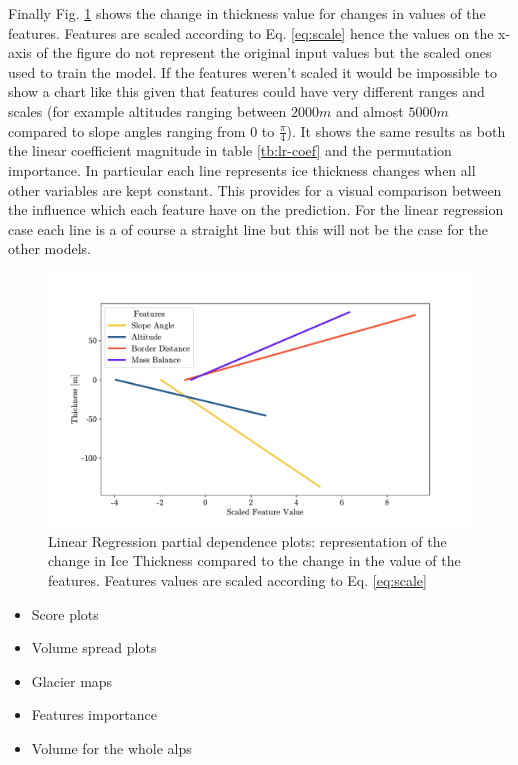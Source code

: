 Finally Fig. \ref{fig:rfr-pdp} shows the change in thickness value for changes in values of the features. Features are scaled according to Eq. \ref{eq:scale} hence the values on the x-axis of the figure do not represent the original input values but the scaled ones used to train the model. If the features weren't scaled it would be impossible to show a chart like this given that features could have very different ranges and scales (for example altitudes ranging between  $2000m$ and almost $5000m$ compared to slope angles ranging from $0$ to $\frac{\pi}{4}$). It shows the same results as both the linear coefficient magnitude in table \ref{tb:lr-coef} and the permutation importance. In particular each line represents ice thickness changes when all other variables are kept constant. This provides for a visual comparison between the influence which each feature have on the prediction. For the linear regression case each line is a of course a straight line but this will not be the case for the other models.

\begin{figure}[!tp]
	\centering		  
	\includegraphics[width=1.\textwidth]{figures/LR_pdp.pdf}
	\caption{Linear Regression partial dependence plots: representation of the change in Ice Thickness compared to the change in the value of the features. Features values are scaled according to Eq. \ref{eq:scale}}
	\label{fig:rfr-pdp}
\end{figure}

\begin{itemize}
	\item[(1)] Score plots
	\item[(2)] Volume spread plots
	\item[(3)] Glacier maps
	\item[(4)] Features importance
	\item[(5)] Volume for the whole alps
\end{itemize}


